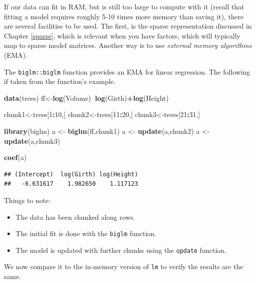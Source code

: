 \documentclass[]{book}
\newenvironment{Shaded}{\begin{snugshade}}{\end{snugshade}}
\newcommand{\DecValTok}[1]{\textcolor[rgb]{0.00,0.00,0.81}{#1}}
\newcommand{\KeywordTok}[1]{\textcolor[rgb]{0.13,0.29,0.53}{\textbf{#1}}}
\newcommand{\NormalTok}[1]{#1}
\newcommand{\OperatorTok}[1]{\textcolor[rgb]{0.81,0.36,0.00}{\textbf{#1}}}
\newcommand{\StringTok}[1]{\textcolor[rgb]{0.31,0.60,0.02}{#1}}
\providecommand{\tightlist}{%
  \setlength{\itemsep}{0pt}\setlength{\parskip}{0pt}}
\theoremstyle{definition}
\theoremstyle{definition}
\theoremstyle{definition}
\theoremstyle{remark}
\begin{document}
If our data can fit in RAM, but is still too large to compute with it (recall that fitting a model requires roughly 5-10 times more memory than saving it), there are several facilities to be used.
The first, is the sparse representation discussed in Chapter \ref{sparse}, which is relevant when you have factors, which will typically map to sparse model matrices.
Another way is to use \emph{external memory algorithms} (EMA).

The \texttt{biglm::biglm} function provides an EMA for linear regression.
The following if taken from the function's example.

\begin{Shaded}
\begin{Highlighting}[]
\KeywordTok{data}\NormalTok{(trees)}
\NormalTok{ff<-}\KeywordTok{log}\NormalTok{(Volume)}\OperatorTok{~}\KeywordTok{log}\NormalTok{(Girth)}\OperatorTok{+}\KeywordTok{log}\NormalTok{(Height)}

\NormalTok{chunk1<-trees[}\DecValTok{1}\OperatorTok{:}\DecValTok{10}\NormalTok{,]}
\NormalTok{chunk2<-trees[}\DecValTok{11}\OperatorTok{:}\DecValTok{20}\NormalTok{,]}
\NormalTok{chunk3<-trees[}\DecValTok{21}\OperatorTok{:}\DecValTok{31}\NormalTok{,]}

\KeywordTok{library}\NormalTok{(biglm)}
\NormalTok{a <-}\StringTok{ }\KeywordTok{biglm}\NormalTok{(ff,chunk1)}
\NormalTok{a <-}\StringTok{ }\KeywordTok{update}\NormalTok{(a,chunk2)}
\NormalTok{a <-}\StringTok{ }\KeywordTok{update}\NormalTok{(a,chunk3)}

\KeywordTok{coef}\NormalTok{(a)}
\end{Highlighting}
\end{Shaded}

\begin{verbatim}
## (Intercept)  log(Girth) log(Height) 
##   -6.631617    1.982650    1.117123
\end{verbatim}

Things to note:

\begin{itemize}
\tightlist
\item
  The data has been chunked along rows.
\item
  The initial fit is done with the \texttt{biglm} function.
\item
  The model is updated with further chunks using the \texttt{update} function.
\end{itemize}

We now compare it to the in-memory version of \texttt{lm} to verify the results are the same.
\end{document}

